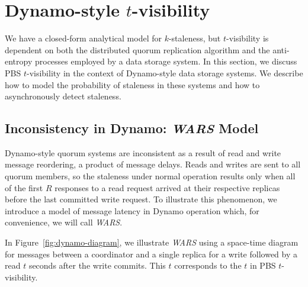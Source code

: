 \documentclass{vldb}
\newcommand{\sectionskip}{-0em}
\newcommand{\subsectionskip}{-0em}
\begin{document}
\vspace{\sectionskip}\section{Dynamo-style $t$-visibility}
\label{sec:dynamo}

We have a closed-form analytical model for $k$-staleness, but
$t$-visibility is dependent on both the distributed quorum replication
algorithm and the anti-entropy processes employed by a data storage
system.  In this section, we discuss PBS $t$-visibility in the context
of Dynamo-style data storage systems.  We describe how to model the
probability of staleness in these systems and how to asynchronously
detect staleness.

\vspace{\subsectionskip}\subsection{Inconsistency in Dynamo: {\large \textit{WARS}} Model}
\label{sec:wars}

Dynamo-style quorum systems are inconsistent as a result of read and
write message reordering, a product of message delays.  Reads and
writes are sent to all quorum members, so the staleness under normal
operation results only when all of the first $R$ responses to a read
request arrived at their respective replicas before the last committed
write request.  To illustrate this phenomenon, we introduce a model
of message latency in Dynamo operation which, for convenience, we will
call \textit{WARS}.

In Figure~\ref{fig:dynamo-diagram}, we illustrate \textit{WARS} using
a space-time diagram for messages between a coordinator and a single
replica for a write followed by a read $t$ seconds after the write
commits.  This $t$ corresponds to the $t$ in PBS $t$-visibility.
\end{document}

